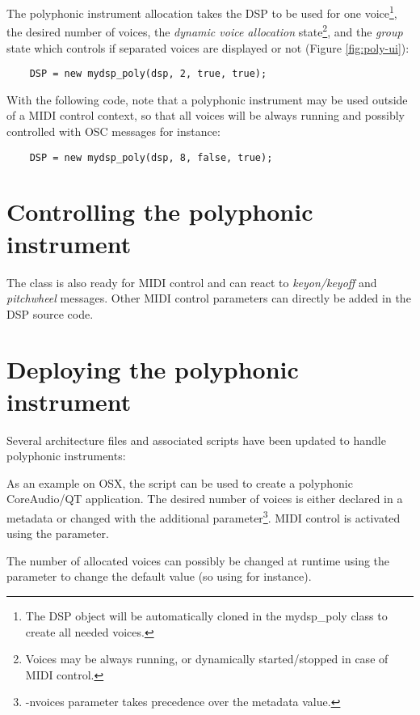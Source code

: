 The polyphonic instrument allocation takes the DSP to be used for one voice\footnote{The DSP object will be automatically cloned in the mydsp\_poly class to create all needed voices.},  the desired number of voices, the {\it dynamic voice allocation} state\footnote{Voices may be always running, or dynamically started/stopped in case of MIDI control.},  and the {\it group} state which controls if separated voices are displayed or not (Figure \ref{fig:poly-ui}): 

\footnotesize
\begin{lstlisting}
    DSP = new mydsp_poly(dsp, 2, true, true);  
\end{lstlisting}
    
\normalsize
With the following code, note that a polyphonic instrument may be used outside of a MIDI control context, so that all voices will be always running and possibly controlled with OSC messages for instance:

\footnotesize
\begin{lstlisting}
    DSP = new mydsp_poly(dsp, 8, false, true);
\end{lstlisting}

\normalsize
    
\section{Controlling the polyphonic instrument}

The  class is also ready for MIDI control and can react to {\it keyon/keyoff} and {\it pitchwheel} messages. Other MIDI control parameters can directly be added in the DSP source code. 

\section{Deploying the polyphonic instrument}

Several architecture files and associated scripts have been updated to handle polyphonic instruments:

As an example on OSX, the script  can be used to create a polyphonic CoreAudio/QT application. The desired number of voices is either declared in a  metadata or changed with the  additional parameter\footnote{-nvoices parameter takes precedence over the  metadata value.}. MIDI control is activated using the  parameter. 

The number of allocated voices can possibly be changed at runtime using the  parameter to change the default value (so using  for instance). 

